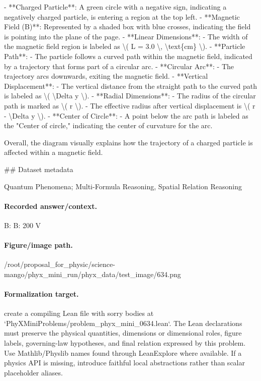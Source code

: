 - **Charged Particle**: A green circle with a negative sign, indicating a negatively charged particle, is entering a region at the top left.
- **Magnetic Field (B)**: Represented by a shaded box with blue crosses, indicating the field is pointing into the plane of the page.
- **Linear Dimensions**:
  - The width of the magnetic field region is labeled as \textbackslash{}( L = 3.0 \textbackslash{}, \textbackslash{}text\{cm\} \textbackslash{}).
- **Particle Path**: 
  - The particle follows a curved path within the magnetic field, indicated by a trajectory that forms part of a circular arc.
- **Circular Arc**: 
  - The trajectory arcs downwards, exiting the magnetic field.
- **Vertical Displacement**: 
  - The vertical distance from the straight path to the curved path is labeled as \textbackslash{}( \textbackslash{}Delta y \textbackslash{}).
- **Radial Dimensions**:
  - The radius of the circular path is marked as \textbackslash{}( r \textbackslash{}).
  - The effective radius after vertical displacement is \textbackslash{}( r - \textbackslash{}Delta y \textbackslash{}).
- **Center of Circle**:
  - A point below the arc path is labeled as the "Center of circle," indicating the center of curvature for the arc.

Overall, the diagram visually explains how the trajectory of a charged particle is affected within a magnetic field.

\#\# Dataset metadata

Quantum Phenomena; Multi-Formula Reasoning, Spatial Relation Reasoning

\paragraph{Recorded answer/context.}
B: B: 200 V

\paragraph{Figure/image path.}
/root/proposal\_for\_physic/science-mango/phyx\_mini\_run/phyx\_data/test\_image/634.png

\paragraph{Formalization target.}
create a compiling Lean file with sorry bodies at `PhyXMiniProblems/problem\_phyx\_mini\_0634.lean`. The Lean declarations must preserve the physical quantities, dimensions or dimensional roles, figure labels, governing-law hypotheses, and final relation expressed by this problem.
Use Mathlib/Physlib names found through LeanExplore where available. If a physics API is missing, introduce faithful local abstractions rather than scalar placeholder aliases.

